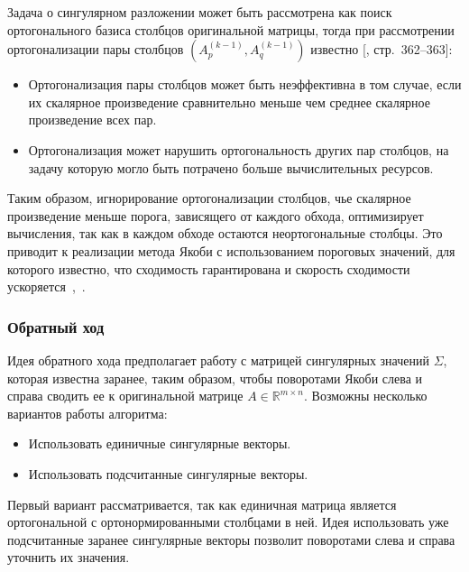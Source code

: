 Задача о сингулярном разложении может быть рассмотрена как поиск ортогонального базиса столбцов оригинальной матрицы, тогда при рассмотрении ортогонализации пары столбцов $(A^{(k-1)}_p, A^{(k-1)}_q)$ известно [, стр.~362–363]:
\begin{itemize}
    \item Ортогонализация пары столбцов может быть неэффективна в том случае, если их скалярное произведение сравнительно меньше чем среднее скалярное произведение всех пар.
    \item Ортогонализация может нарушить ортогональность других пар столбцов, на задачу которую могло быть потрачено больше вычислительных ресурсов. 
\end{itemize}
Таким образом, игнорирование ортогонализации столбцов, чье скалярное произведение меньше порога, зависящего от каждого обхода,  оптимизирует вычисления, так как в каждом обходе остаются неортогональные столбцы. Это приводит к реализации метода Якоби с использованием пороговых значений, для которого известно, что сходимость гарантирована и скорость сходимости ускоряется~\cite{Dongarra2018},~\cite{Forsythe1960}. 

\subsubsection{Обратный ход}


Идея обратного хода предполагает работу с матрицей сингулярных значений $\Sigma$, которая известна заранее, таким образом, чтобы поворотами Якоби слева и справа сводить ее к оригинальной матрице $A \in \mathbb{R}^{m\times n}$. Возможны несколько вариантов работы алгоритма: 
\begin{itemize}
    \item Использовать единичные сингулярные векторы.
    \item Использовать подсчитанные сингулярные векторы.
\end{itemize}
Первый вариант рассматривается, так как единичная матрица является ортогональной с ортонормированными столбцами в ней. 
Идея использовать уже подсчитанные заранее сингулярные векторы позволит поворотами слева и справа уточнить их значения. 

